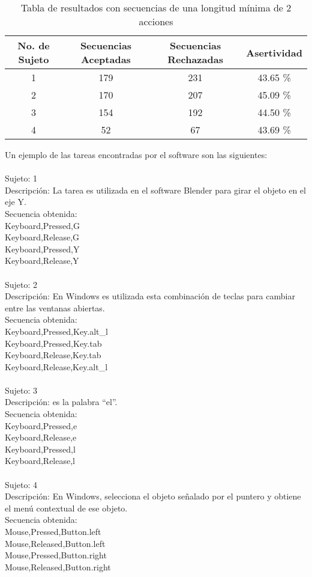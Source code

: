 \begin{table}[]
\centering
\begin{tabular}{cccc}
\hline
		No. de Sujeto	&	Secuencias Aceptadas	&   Secuencias Rechazadas	&	Asertividad		\\ \hline
		1				&	179						&	231						&	43.65 \%		\\
		2				&	170						&	207						&	45.09 \%		\\
		3				&	154						&	192						&	44.50 \%		\\
		4				&	52						&	67						&	43.69 \%		\\
\hline
\end{tabular}
\caption{Tabla de resultados con secuencias de una longitud m\'inima de 2 acciones}
\label{tableRes2}
\end{table}


Un ejemplo de las tareas encontradas por el software son las siguientes:
\\
\\
Sujeto: 1	\\
Descripci\'on: La tarea es utilizada en el software Blender para girar el objeto en el eje Y.	\\
Secuencia obtenida:\\
Keyboard,Pressed,G\\
Keyboard,Release,G\\
Keyboard,Pressed,Y\\
Keyboard,Release,Y\\
\\
Sujeto: 2	\\
Descripci\'on: En Windows es utilizada esta combinaci\'on de teclas para cambiar entre las ventanas abiertas.	\\
Secuencia obtenida:\\
Keyboard,Pressed,Key.alt\_l	\\
Keyboard,Pressed,Key.tab	\\
Keyboard,Release,Key.tab	\\
Keyboard,Release,Key.alt\_l	\\
\\
Sujeto: 3	\\
Descripci\'on: es la palabra ``el''.	\\
Secuencia obtenida:\\
Keyboard,Pressed,e	\\
Keyboard,Release,e	\\
Keyboard,Pressed,l	\\
Keyboard,Release,l	\\
\\
Sujeto: 4	\\
Descripci\'on: En Windows, selecciona el objeto se\~nalado por el puntero y obtiene el men\'u contextual de ese objeto.	\\
Secuencia obtenida:\\	
Mouse,Pressed,Button.left	\\
Mouse,Released,Button.left	\\
Mouse,Pressed,Button.right	\\
Mouse,Released,Button.right	\\
